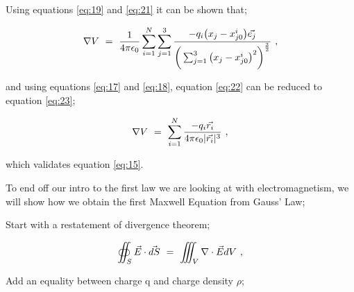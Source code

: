 \documentclass{article}
\begin{document}


Using equations \ref{eq:19} and \ref{eq:21} it can be shown that;

\begin{equation} \label{eq:22}
\nabla{V} \hspace{0.125cm} = \hspace{0.125cm} \frac{1}{4\pi \epsilon_0} \sum_{i=1}^{N} \sum_{j=1}^{3} \frac{-q_i\big( x_{j} - x_{j0}^{i} \big) \vec{e_{j}}}{{\bigg( \sum_{j=1}^{3} \big( x_{j} - x_{j0}^{i} \big)^{2} \bigg)^{\frac{3}{2}}}} \hspace{0.125cm} ,
\end{equation} 


and using equations \ref{eq:17} and \ref{eq:18}, equation \ref{eq:22} can be reduced to equation \ref{eq:23};

\begin{equation} \label{eq:23}
\nabla{V} \hspace{0.125cm} = \hspace{0.125cm} \sum_{i=1}^{N} \frac{-q_{i}\vec{r_{i}}}{4\pi \epsilon_0 |\vec{r_{i}}|^{3}} \hspace{0.125cm} , 
\end{equation}

which validates equation \ref{eq:15}. 

To end off our intro to the first law we are looking at with electromagnetism, we will show how we obtain the first Maxwell Equation from Gauss' Law;

Start with a restatement of divergence theorem; 

\begin{equation} \label{eq:24}
\oiint_S \vec{E}\cdot\vec{dS} \hspace{0.125cm} = \hspace{0.125cm}
\iiint_V \nabla\cdot\vec{E}dV \hspace{0.125cm} , 
\end{equation} 

Add an equality between charge q and charge density \begin{math} \rho \end{math}; 
\end{document}
